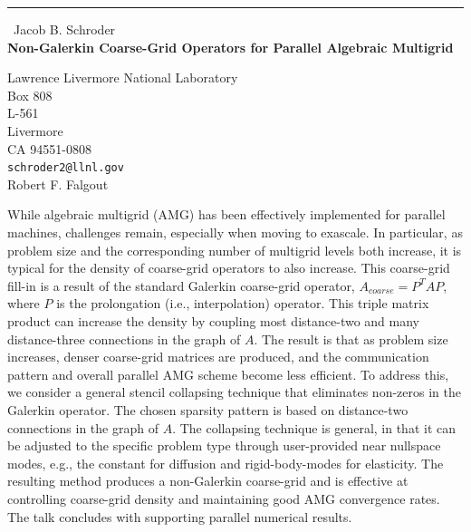 \documentclass{report}
\begin{document}
\begin{center}
\rule{6in}{1pt} \
{\large Jacob B. Schroder \\
{\bf Non-Galerkin Coarse-Grid Operators for Parallel Algebraic Multigrid}}

Lawrence Livermore National Laboratory \\ Box 808 \\ L-561 \\ Livermore \\ CA 94551-0808
\\
{\tt schroder2@llnl.gov}\\
Robert F. Falgout\end{center}

While algebraic multigrid (AMG) has been effectively implemented for parallel
machines, challenges remain, especially when moving to exascale. In
particular, as problem size and the corresponding number of multigrid levels both
increase, it is typical for the density of coarse-grid operators to also
increase. This coarse-grid fill-in is a result of the standard Galerkin
coarse-grid operator, $A_{coarse} = P^T A P$, where $P$ is the prolongation
(i.e., interpolation) operator. This triple matrix product can increase the
density by coupling most distance-two and many distance-three connections in
the graph of $A$. The result is that as problem size increases, denser
coarse-grid matrices are produced, and the communication pattern and overall
parallel AMG scheme become less efficient. To address this, we consider a
general stencil collapsing technique that eliminates non-zeros in the Galerkin
operator. The chosen sparsity pattern is based on distance-two connections in
the graph of $A$. The collapsing technique is general, in that it can be
adjusted to the specific problem type through user-provided near nullspace
modes, e.g., the constant for diffusion and rigid-body-modes for elasticity.
The resulting method produces a non-Galerkin coarse-grid and is effective at
controlling coarse-grid density and maintaining good AMG convergence rates. The
talk concludes with supporting parallel numerical results.
\end{document}
